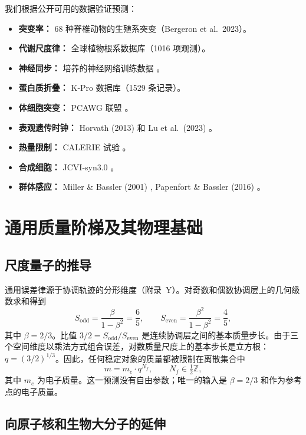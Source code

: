 \documentclass[11pt,a4paper]{article}
\begin{document}
	我们根据公开可用的数据验证预测：
	\begin{itemize}
		\item \textbf{突变率：} 68 种脊椎动物的生殖系突变（Bergeron et al.\ 2023）\cite{Bergeron2023a}。
		\item \textbf{代谢尺度律：} 全球植物根系数据库（1016 项观测）\cite{Yuan2020}。
		\item \textbf{神经同步：} 培养的神经网络训练数据 \cite{PLOS2025b}。
		\item \textbf{蛋白质折叠：} K‑Pro 数据库（1529 条记录）\cite{Turina2023}。
		\item \textbf{体细胞突变：} PCAWG 联盟 \cite{PCAWG2020}。
		\item \textbf{表观遗传时钟：} Horvath (2013) 和 Lu et al.\ (2023) \cite{Horvath2013, Lu2023}。
		\item \textbf{热量限制：} CALERIE 试验 \cite{CALERIE2018, CALERIE2024}。
		\item \textbf{合成细胞：} JCVI‑syn3.0 \cite{Hutchison2016, Pelletier2023}。
		\item \textbf{群体感应：} Miller \& Bassler (2001) \cite{Miller2001}, Papenfort \& Bassler (2016) \cite{Papenfort2016}。
	\end{itemize}
	
	\section{通用质量阶梯及其物理基础}
	
	\subsection{尺度量子的推导}
	
	通用误差律源于协调轨迹的分形维度（附录~Y）。对奇数和偶数协调层上的几何级数求和得到
	\[
	S_{\mathrm{odd}} = \frac{\beta}{1-\beta^2} = \frac{6}{5}, \qquad
	S_{\mathrm{even}} = \frac{\beta^2}{1-\beta^2} = \frac{4}{5},
	\]
	其中 \(\beta = 2/3\)。比值 \(3/2 = S_{\mathrm{odd}}/S_{\mathrm{even}}\) 是连续协调层之间的基本质量步长。由于三个空间维度以乘法方式组合误差，对数质量尺度上的基本步长是立方根：\(q = (3/2)^{1/3}\)。因此，任何稳定对象的质量都被限制在离散集合中
	\begin{equation}
		m = m_e \cdot q^{N_f}, \qquad N_f \in \tfrac12\mathbb{Z},
		\label{eq:quantization}
	\end{equation}
	其中 \(m_e\) 为电子质量。这一预测没有自由参数；唯一的输入是 \(\beta = 2/3\) 和作为参考点的电子质量。
	
	\subsection{向原子核和生物大分子的延伸}
	
\end{document}
